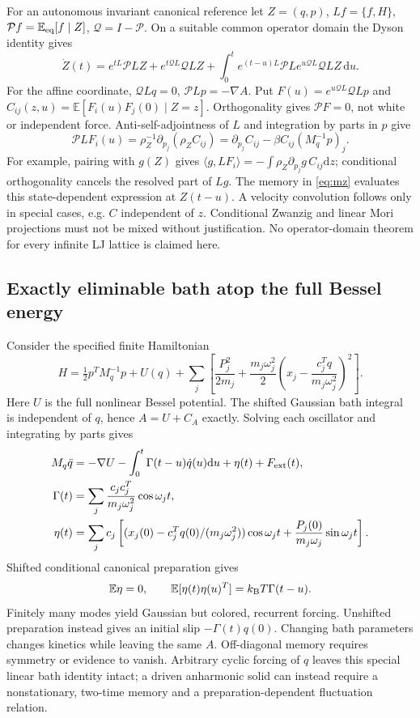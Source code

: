 \documentclass[11pt]{article}
\newcommand{\kb}{k_{\rm B}}
\newcommand{\dd}{\mathrm d}
\newcommand{\E}{\mathbb E}
\newcommand{\Pm}{\mathcal P}
\newcommand{\Qm}{\mathcal Q}
\begin{document}
For an autonomous invariant canonical reference let $Z=(q,p)$,
$Lf=\{f,H\}$, $\Pm f=\E_{\rm eq}[f\mid Z]$, $\Qm=I-\Pm$.
On a suitable common operator domain the Dyson identity gives
\begin{equation}
\dot Z(t)=e^{tL}\Pm LZ+e^{t\Qm L}\Qm LZ
 +\int_0^t e^{(t-u)L}\Pm Le^{u\Qm L}\Qm LZ\,\dd u.
\label{eq:mz}
\end{equation}
For the affine coordinate, $\Qm Lq=0$, $\Pm Lp=-\nabla A$.
Put $F(u)=e^{u\Qm L}\Qm Lp$ and
$C_{ij}(z,u)=\E[F_i(u)F_j(0)\mid Z=z]$. Orthogonality gives $\Pm F=0$,
not white or independent force. Anti-self-adjointness of $L$ and integration
by parts in $p$ give
\begin{equation}
\boxed{\Pm LF_i(u)=\rho_Z^{-1}\partial_{p_j}(\rho_Z C_{ij})
 =\partial_{p_j}C_{ij}-\beta C_{ij}(M_q^{-1}p)_j.}
\end{equation}
For example, pairing with $g(Z)$ gives
$\langle g,LF_i\rangle=-\int\rho_Z\partial_{p_j}g\,C_{ij}\dd z$;
conditional orthogonality cancels the resolved part of $Lg$.
The memory in \eqref{eq:mz} evaluates this state-dependent expression at
$Z(t-u)$. A velocity convolution follows only in special cases, e.g.
$C$ independent of $z$. Conditional Zwanzig and linear Mori projections
must not be mixed without justification\cite{Mori1965,Zwanzig1973,Ayaz2022}.
No operator-domain theorem for every infinite LJ lattice is claimed here.

\subsection{Exactly eliminable bath atop the full Bessel energy}
Consider the specified finite Hamiltonian
\begin{equation}
H=\tfrac12p^TM_q^{-1}p+U(q)+\sum_j\left[
 \frac{P_j^2}{2m_j}+\frac{m_j\omega_j^2}{2}
 \left(x_j-\frac{c_j^Tq}{m_j\omega_j^2}\right)^2\right].
\end{equation}
Here $U$ is the full nonlinear Bessel potential. The shifted Gaussian bath
integral is independent of $q$, hence $A=U+C_A$ exactly. Solving each
oscillator and integrating by parts gives
\begin{align}
M_q\ddot q&=-\nabla U-\int_0^t\Gamma(t-u)\dot q(u)\dd u
                   +\eta(t)+F_{\rm ext}(t),\\
\Gamma(t)&=\sum_j\frac{c_jc_j^T}{m_j\omega_j^2}\cos\omega_jt,\\
\eta(t)&=\sum_jc_j\left[
 (x_j(0)-c_j^Tq(0)/(m_j\omega_j^2))\cos\omega_jt
 +\frac{P_j(0)}{m_j\omega_j}\sin\omega_jt\right].
\end{align}
Shifted conditional canonical preparation gives
\begin{equation}
\E\eta=0,\qquad \E[\eta(t)\eta(u)^T]=\kb T\Gamma(t-u).
\end{equation}
Finitely many modes yield Gaussian but colored, recurrent forcing.
Unshifted preparation instead gives an initial slip $-\Gamma(t)q(0)$.
Changing bath parameters changes kinetics while leaving the same $A$.
Off-diagonal memory requires symmetry or evidence to vanish. Arbitrary
cyclic forcing of $q$ leaves this special linear bath identity intact;
a driven anharmonic solid can instead require a nonstationary, two-time
memory and a preparation-dependent fluctuation relation.
\end{document}
